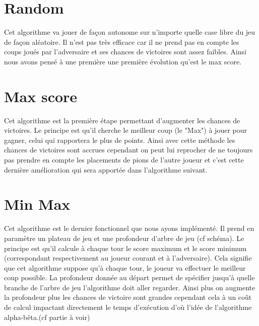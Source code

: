 \documentclass{report}
\begin{document}
		\section{Random}
		Cet algorithme va jouer de façon autonome sur n'importe quelle case libre du jeu de façon aléatoire. Il n'est pas très efficace car il ne prend pas en compte les coups joués par l'adversaire et ses chances de victoires sont assez faibles. Ainsi nous avons pensé à une première une première évolution qu'est le max score.
		\section{Max score}
		Cet algorithme est la première étape permettant d'augmenter les chances de victoires. Le principe est qu'il cherche le meilleur coup (le "Max") à jouer pour gagner, celui qui rapportera le plus de points. Ainsi avec cette méthode les chances de victoires sont accrues cependant on peut lui reprocher de ne toujours pas prendre en compte les placements de pions de l'autre joueur et c'est cette dernière amélioration qui sera apportée dans l'algorithme suivant. 
		\section{Min Max}
        Cet algorithme est le dernier fonctionnel que nous ayons implémenté. Il prend en paramètre un plateau de jeu et une profondeur d'arbre de jeu (cf schéma). Le principe est qu'il calcule à chaque tour le score maximum et le score minimum (correspondant respectivement au joueur courant et à l'adversaire). Cela signifie que cet algorithme suppose qu'à chaque tour, le joueur va effectuer le meilleur coup possible. La profondeur donnée au départ permet de spécifier jusqu'à quelle branche de l'arbre de jeu l'algorithme doit aller regarder. Ainsi plus on augmente la profondeur plus les chances de victoire sont grandes cependant cela à un coût de calcul impactant directement le temps d'exécution d'où l'idée de l'algorithme alpha-bêta.(cf partie à voir)
\end{document}
